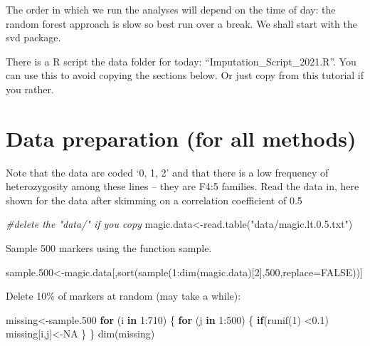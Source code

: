 \documentclass[
]{book}
\makeatletter
\newenvironment{Shaded}{\begin{snugshade}}{\end{snugshade}}
\newcommand{\AttributeTok}[1]{\textcolor[rgb]{0.77,0.63,0.00}{#1}}
\newcommand{\CommentTok}[1]{\textcolor[rgb]{0.56,0.35,0.01}{\textit{#1}}}
\newcommand{\ConstantTok}[1]{\textcolor[rgb]{0.00,0.00,0.00}{#1}}
\newcommand{\ControlFlowTok}[1]{\textcolor[rgb]{0.13,0.29,0.53}{\textbf{#1}}}
\newcommand{\DecValTok}[1]{\textcolor[rgb]{0.00,0.00,0.81}{#1}}
\newcommand{\FloatTok}[1]{\textcolor[rgb]{0.00,0.00,0.81}{#1}}
\newcommand{\FunctionTok}[1]{\textcolor[rgb]{0.00,0.00,0.00}{#1}}
\newcommand{\NormalTok}[1]{#1}
\newcommand{\OtherTok}[1]{\textcolor[rgb]{0.56,0.35,0.01}{#1}}
\newcommand{\SpecialCharTok}[1]{\textcolor[rgb]{0.00,0.00,0.00}{#1}}
\newcommand{\StringTok}[1]{\textcolor[rgb]{0.31,0.60,0.02}{#1}}
\newenvironment{kframe}{%
\medskip{}
\setlength{\fboxsep}{.8em}
 \def\at@end@of@kframe{}%
 \ifinner\ifhmode%
  \def\at@end@of@kframe{\end{minipage}}%
  \begin{minipage}{\columnwidth}%
 \fi\fi%
 \def\FrameCommand##1{\hskip\@totalleftmargin \hskip-\fboxsep
 \colorbox{shadecolor}{##1}\hskip-\fboxsep
     \hskip-\linewidth \hskip-\@totalleftmargin \hskip\columnwidth}%
 \MakeFramed {\advance\hsize-\width
   \@totalleftmargin\z@ \linewidth\hsize
   \@setminipage}}%
 {\par\unskip\endMakeFramed%
 \at@end@of@kframe}
\newenvironment{rmdblock}[1]
  {
  \begin{itemize}
  \renewcommand{\labelitemi}{
    \raisebox{-.7\height}[0pt][0pt]{
      {\setkeys{Gin}{width=3em,keepaspectratio}\texttt{[image: images/\#1]}}
    }
  }
  \setlength{\fboxsep}{1em}
  \begin{kframe}
  \item
  }
  {
  \end{kframe}
  \end{itemize}
  }
\newenvironment{rmdnote}
  {\begin{rmdblock}{note}}
  {\end{rmdblock}}
\makeatother
\begin{document}
The order in which we run the analyses will depend on the time of day: the random forest approach is slow so best run over a break. We shall start with the svd package.

\begin{rmdnote}
There is a R script the data folder for today: ``Imputation\_Script\_2021.R''. You can use this to avoid copying the sections below. Or just copy from this tutorial if you rather.
\end{rmdnote}

\hypertarget{data-preparation-for-all-methods}{%
\section{Data preparation (for all methods)}\label{data-preparation-for-all-methods}}

Note that the data are coded `0, 1, 2' and that there is a low frequency of heterozygosity among these lines -- they are F4:5 families. Read the data in, here shown for the data after skimming on a correlation coefficient of 0.5

\begin{Shaded}
\begin{Highlighting}[]
\CommentTok{\#delete the "data/" if you copy}
\NormalTok{magic.data}\OtherTok{\textless{}{-}}\FunctionTok{read.table}\NormalTok{(}\StringTok{"data/magic.lt.0.5.txt"}\NormalTok{)}
\end{Highlighting}
\end{Shaded}

Sample 500 markers using the function sample.

\begin{Shaded}
\begin{Highlighting}[]
\NormalTok{sample}\FloatTok{.500}\OtherTok{\textless{}{-}}\NormalTok{magic.data[,}\FunctionTok{sort}\NormalTok{(}\FunctionTok{sample}\NormalTok{(}\DecValTok{1}\SpecialCharTok{:}\FunctionTok{dim}\NormalTok{(magic.data)[}\DecValTok{2}\NormalTok{],}\DecValTok{500}\NormalTok{,}\AttributeTok{replace=}\ConstantTok{FALSE}\NormalTok{))]}
\end{Highlighting}
\end{Shaded}

Delete 10\% of markers at random (may take a while):

\begin{Shaded}
\begin{Highlighting}[]
\NormalTok{missing}\OtherTok{\textless{}{-}}\NormalTok{sample}\FloatTok{.500}
\ControlFlowTok{for}\NormalTok{ (i }\ControlFlowTok{in} \DecValTok{1}\SpecialCharTok{:}\DecValTok{710}\NormalTok{) \{}
  \ControlFlowTok{for}\NormalTok{ (j }\ControlFlowTok{in} \DecValTok{1}\SpecialCharTok{:}\DecValTok{500}\NormalTok{)  \{}
    \ControlFlowTok{if}\NormalTok{(}\FunctionTok{runif}\NormalTok{(}\DecValTok{1}\NormalTok{) }\SpecialCharTok{\textless{}}\FloatTok{0.1}\NormalTok{) missing[i,j]}\OtherTok{\textless{}{-}}\ConstantTok{NA}
\NormalTok{  \}}
\NormalTok{\}}
\FunctionTok{dim}\NormalTok{(missing) }
\end{Highlighting}
\end{Shaded}
\end{document}
